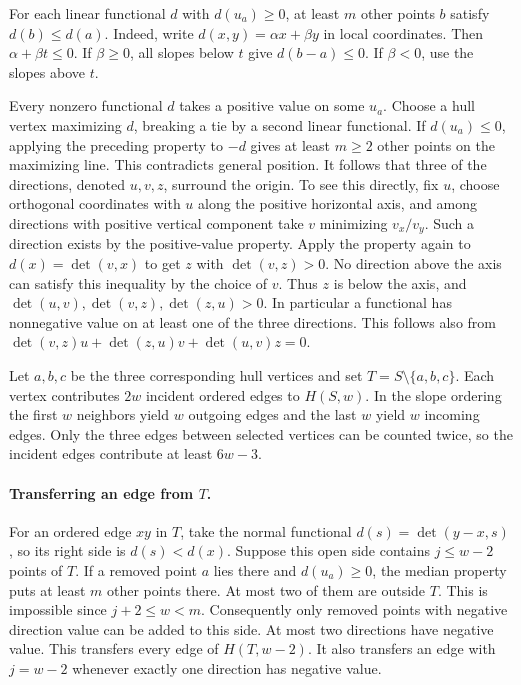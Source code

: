 \documentclass[11pt]{article}
\begin{document}
For each linear functional \(d\) with \(d(u_a)\ge0\), at least \(m\)
other points \(b\) satisfy \(d(b)\le d(a)\). Indeed, write
\(d(x,y)=\alpha x+\beta y\) in local coordinates. Then
\(\alpha+\beta t\le0\). If \(\beta\ge0\), all slopes below \(t\)
give \(d(b-a)\le0\). If \(\beta<0\), use the slopes above \(t\).

Every nonzero functional \(d\) takes a positive value on some \(u_a\).
Choose a hull vertex maximizing \(d\), breaking a tie by a second
linear functional. If \(d(u_a)\le0\), applying the preceding property
to \(-d\) gives at least \(m\ge2\) other points on the maximizing
line. This contradicts general position. It follows that three of the
directions, denoted \(u,v,z\), surround the origin. To see this
directly, fix \(u\), choose orthogonal coordinates with \(u\) along
the positive horizontal axis, and among directions with positive
vertical component take \(v\) minimizing \(v_x/v_y\). Such a direction
exists by the positive-value property. Apply the property again to
\(d(x)=\det(v,x)\) to get \(z\) with \(\det(v,z)>0\). No direction
above the axis can satisfy this inequality by the choice of \(v\).
Thus \(z\) is below the axis, and
\(\det(u,v),\det(v,z),\det(z,u)>0\). In particular a functional has
nonnegative value on at least one of the three directions. This follows
also from
\(\det(v,z)u+\det(z,u)v+\det(u,v)z=0\).

Let \(a,b,c\) be the three corresponding hull vertices and set
\(T=S\setminus\{a,b,c\}\). Each vertex contributes \(2w\) incident
ordered edges to \(H(S,w)\). In the slope ordering the first \(w\)
neighbors yield \(w\) outgoing edges and the last \(w\) yield \(w\)
incoming edges. Only the three edges between selected vertices can be
counted twice, so the incident edges contribute at least \(6w-3\).

\paragraph{Transferring an edge from \(T\).}
For an ordered edge \(xy\) in \(T\), take the normal functional
\(d(s)=\det(y-x,s)\), so its right side is \(d(s)<d(x)\). Suppose
this open side contains \(j\le w-2\) points of \(T\). If a removed
point \(a\) lies there and \(d(u_a)\ge0\), the median property puts at
least \(m\) other points there. At most two of them are outside \(T\).
This is impossible since \(j+2\le w<m\). Consequently only removed
points with negative direction value can be added to this side.
At most two directions have negative value. This transfers every edge
of \(H(T,w-2)\). It also transfers an edge with \(j=w-2\) whenever
exactly one direction has negative value.
\end{document}
